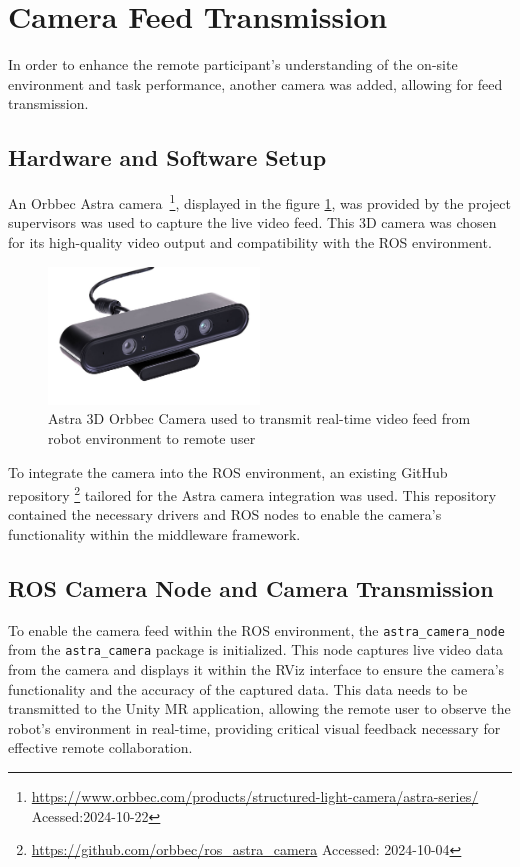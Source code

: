 \section{Camera Feed Transmission}

In order to enhance the remote participant's understanding of the on-site environment and task performance, another camera was added, allowing for feed transmission. 

\subsection{Hardware and Software Setup}
An Orbbec Astra camera~\footnote{\url{https://www.orbbec.com/products/structured-light-camera/astra-series/} Acessed:2024-10-22}, displayed in the figure \ref{fig:astra-camera}, was provided by the project supervisors was used to capture the live video feed. This 3D camera was chosen for its high-quality video output and compatibility with the \ac{ROS} environment.

\begin{figure}[h]
    \centering
    \includegraphics[width=0.5\textwidth]{figs/AstraSeries_3.jpg}
    \caption{Astra 3D Orbbec Camera used to transmit real-time video feed from robot environment to remote user}
    \label{fig:astra-camera}
\end{figure}
\FloatBarrier

To integrate the camera into the \ac{ROS} environment, an existing GitHub repository \footnote{\url{https://github.com/orbbec/ros_astra_camera} Accessed: 2024-10-04} tailored for the Astra camera integration was used. This repository contained the necessary drivers and \ac{ROS} nodes to enable the camera's functionality within the middleware framework.


\subsection{ROS Camera Node and Camera Transmission}

To enable the camera feed within the \ac{ROS} environment, the \texttt{astra\_camera\_node} from the \texttt{astra\_camera} package is initialized. This node captures live video data from the camera and displays it within the RViz interface to ensure the camera’s functionality and the accuracy of the captured data. This data needs to be transmitted to the Unity \ac{MR} application, allowing the remote user to observe the robot's environment in real-time, providing critical visual feedback necessary for effective remote collaboration.

